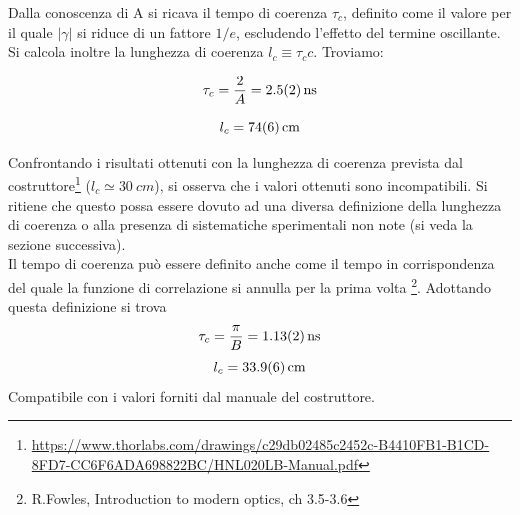 \documentclass[10pt,oneside,a4paper]{article}
\begin{document}
\begin{multicols}{2}
Dalla conoscenza di A si ricava il tempo di coerenza $\tau_c$, definito come il valore per il quale $\vert\gamma\vert$ si riduce di un fattore $1/e$, escludendo l'effetto del termine oscillante. Si calcola inoltre la lunghezza di coerenza $l_c \equiv \tau_c c$. Troviamo:

$$\tau_c = \frac{2}{A} = \SI{2.5 \pm 0.2}{\ns}$$

$$l_c = \SI{74 \pm 6}{cm}$$

Confrontando i risultati ottenuti con la lunghezza di coerenza prevista dal costruttore\footnote{\url{https://www.thorlabs.com/drawings/c29db02485c2452c-B4410FB1-B1CD-8FD7-CC6F6ADA698822BC/HNL020LB-Manual.pdf}} ($l_c \simeq \SI{30}{cm}$), si osserva che i valori ottenuti sono incompatibili. Si ritiene che questo possa essere dovuto ad una diversa definizione della lunghezza di coerenza o alla presenza di sistematiche sperimentali non note (si veda la sezione successiva).\\
Il tempo di coerenza può essere definito anche come il tempo in corrispondenza del quale la funzione di correlazione si annulla per la prima volta \footnote{R.Fowles, Introduction to modern optics, ch 3.5-3.6}. Adottando questa definizione si trova
$$\tau_c = \frac{\pi}{B} = \SI{1.13 \pm 0.02}{ns}$$
$$l_c = \SI{33.9 \pm 0.6}{cm}$$
Compatibile con i valori forniti dal manuale del costruttore.



\end{multicols}
\end{document}
